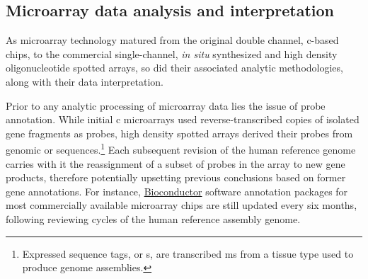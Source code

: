 


\subsection{Microarray data analysis and interpretation}
\label{sec:discussion-interpretation-microarrays}

As microarray technology matured from the original double channel,
\mbox{c-based} chips,\cite{schena_quantitative_1995} to the
commercial single-channel, \emph{in situ} synthesized and high density
oligonucleotide spotted arrays,\cite{lockhart_expression_1996} so did their
associated analytic methodologies, along with their data interpretation.


Prior to any analytic processing of microarray data lies the issue of probe
annotation.  While initial c microarrays used reverse-transcribed
copies of isolated gene fragments as probes, high density spotted arrays derived
their probes from genomic or  sequences.\footnote{Expressed
  sequence tags, or s, are transcribed ms from a
  tissue type used to produce genome assemblies.} Each subsequent revision of
the human reference genome carries with it the reassignment of a subset of
probes in the array to new gene products, therefore potentially upsetting
previous conclusions based on former gene annotations.  For instance,
\href{http://www.bioconductor.org/}{\textsf{Bioconductor}} software annotation
packages for most commercially available microarray chips are still updated
every six months, following reviewing cycles of the human reference assembly
genome.

